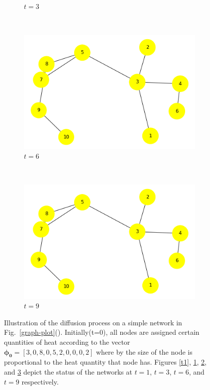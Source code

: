 \documentclass[10pt,a4paper]{article}
\begin{document}
\begin{figure}[!h]
\begin{subfigure}[b]{0.38\textwidth}
		\caption{$t=3$}
		\label{t2}
	\end{subfigure}\\
	\begin{subfigure}[b]{0.38\textwidth}
		\includegraphics[width=\textwidth]{images/newdiff-nodesize14.png}
		\caption{$t=6$}
		\label{t3}
	\end{subfigure}~
	\begin{subfigure}[b]{0.38\textwidth}
		\includegraphics[width= \textwidth]{images/newdiff-nodesize29.png}
		\caption{$t=9$}
		\label{t4}
	\end{subfigure}
	\caption{Illustration of the diffusion process on a simple network in Fig.~\ref{graph-plot}(). Initially(t=0), all nodes are assigned certain quantities of heat according to the vector $\mathbf{\phi_0} = [3,0,8,0,5,2,0,0,0,2]$ where by the size of the node is proportional to the heat quantity that node has. Figures \ref{t1}, \ref{t2}, \ref{t3}, and \ref{t4} depict the status of the networks at $t=1$, $t=3$, $t=6$, and $t=9$ respectively. }
	\label{visualise}
\end{figure}
\end{document}
